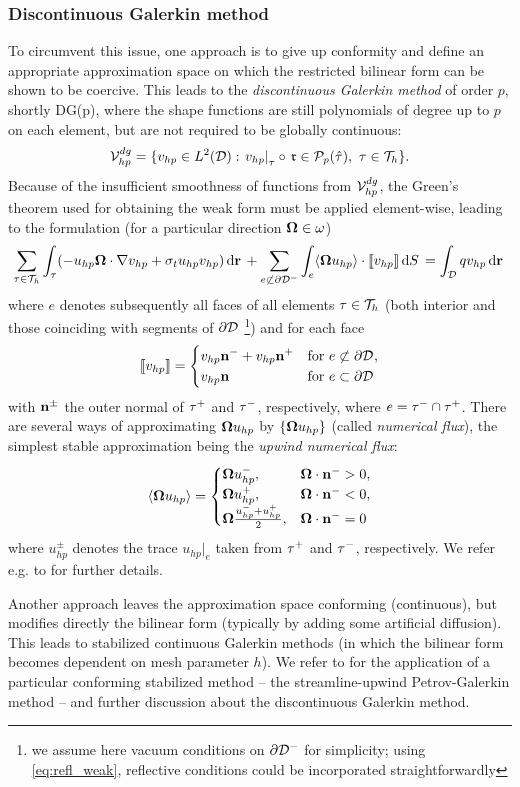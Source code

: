\subsubsection{Discontinuous Galerkin method}\label{sec:DGM}
To circumvent this issue, one approach is to give up conformity and define an appropriate approximation space on which
the restricted bilinear form can be shown to be coercive. This leads to the \textit{discontinuous Galerkin method}
of order $p$, shortly DG(p), where the shape functions are still polynomials of degree up to $p$ on each element, but
are not required to be globally continuous:
$$
\Space_{hp}^{dg} = \{v_{hp} \in \Lp[2](\VV): \left. v_{hp}\right\vert_{\elem} \circ\, \mathfrak{r} \in
	\mathcal{P}_p(\hat{\elem}),\ \elem\in\mesh
	\}.
$$
Because of the insufficient smoothness of functions from $\Space_{hp}^{dg}$, the Green's theorem used for obtaining the
weak form must be applied element-wise, leading to the formulation (for a particular direction $\bomega\in\omega$) 
$$
	\sum_{\elem\in\mesh}\int_{\elem} (-u_{hp}\bomega\cdot\nabla v_{hp} + 
	\sigma_t u_{hp} v_{hp})\,\d{\br} + \sum_{e\not\subset\pV[-]}\int_{e} \langle\bomega u_{hp}\rangle\cdot \jump{v_{hp}}\,
	\d{S} = \int_{\VV} q v_{hp}\,\d{\br} 
$$
where $e$ denotes subsequently all faces of all elements $\elem\in\mesh$ (both interior and those coinciding with
segments of $\pV$ \footnote{we assume here vacuum conditions on $\pV[-]$ for simplicity; using \eqref{eq:refl_weak},
reflective conditions could be incorporated straightforwardly}) and for each face 
$$
	\jump{v_{hp}} = \pw{v_{hp}\bn^- + v_{hp}\bn^+}{for $e\not\subset\pV$}{v_{hp}\bn}{for $e\subset\pV$}
$$
with $\bn^{\pm}$ the outer normal of $\elem^+$ and $\elem^-$, respectively, where $e = \elem^- \cap \elem^+$.
There are several ways of approximating $\bomega u_{hp}$ by $\{\bomega u_{hp}\}$ (called \textit{numerical flux}), the
simplest stable approximation being the \textit{upwind numerical flux}:
$$
	\langle\bomega u_{hp}\rangle = 
	\begin{cases}
		\bomega u_{hp}^-, & \bomega\cdot\bn^- > 0,\\
		\bomega u_{hp}^+, & \bomega\cdot\bn^- < 0,\\
		\bomega \frac{u_{hp}^- + u_{hp}^+}{2}, & \bomega\cdot\bn^- = 0
	\end{cases}
$$
where $u_{hp}^{\pm}$ denotes the trace $u_{hp}\vert_e$ taken from $\elem^+$ and $\elem^-$, respectively. We refer e.g.
to \cite{hartmann} for further details.

Another approach leaves the approximation space conforming (continuous), but modifies directly the bilinear form
(typically by adding some artificial diffusion). This leads to stabilized continuous Galerkin methods (in which
the bilinear form becomes dependent on mesh parameter $h$). We refer to \cite{kanschat} for the application of a
particular conforming stabilized method -- the streamline-upwind Petrov-Galerkin method -- and further discussion about
the discontinuous Galerkin method.

